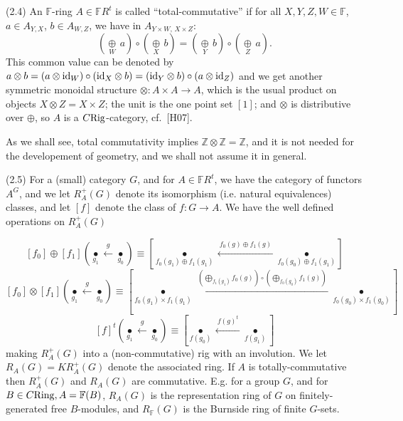 \documentclass[leqno]{article}
\numberwithin{equation}{section}
\begin{document}
\bigskip

\noindent (2.4)  An ${\mathbb F}$-ring $A \in {\mathbb F} R^t$ is called ``total-commutative'' if for all $X,Y,Z,W \in {\mathbb F}$, $a \in A_{Y,X}$, $b \in A_{W,Z}$, we have in $A_{Y \times W , \, X \times Z}$:
$$
\left( \underset{W}{\oplus} \, a \right) \circ \left( \underset{X}{\oplus} \, b \right) = \left( \underset{Y}{\oplus} \, b \right) \circ \left( \underset{Z}{\oplus} \, a \right) .
$$
This common value can be denoted by $a \otimes b = (a \otimes {\rm id}_W) \circ ({\rm id}_X \otimes b) =  ({\rm id}_Y \otimes b) \circ (a \otimes {\rm id}_Z)$ and we get another symmetric monoidal structure $\otimes : A \times A \to A$, which is the usual product on objects $X \otimes Z = X \times Z$; the unit is the one point set $[1]$; and $\otimes$ is distributive over $\oplus$, so $A$ is a $C{\rm Rig}$-category, cf.~[H07].

\smallskip

As we shall see, total commutativity implies ${\mathbb Z} \otimes {\mathbb Z} = {\mathbb Z}$, and it is not needed for the developement of geometry, and we shall not assume it in general.

\bigskip

\noindent (2.5)  For a (small) category $G$, and for $A \in {\mathbb F} R^t$, we have the category of functors $A^G$, and we let $R_A^+ (G)$ denote its isomorphism (i.e. natural equivalences) classes, and let $[f]$ denote the class of $f : G \to A$. We have the well defined operations on $R_A^+ (G)$

$$
[f_0] \oplus [f_1] \left( \underset{g_1}{\bullet} \overset{g}{\longleftarrow} \underset{g_0}{\bullet} \right) \equiv \left[ \underset{f_0 (g_1) \oplus f_1 (g_1)}{\bullet} \xleftarrow{ \ f_0 (g) \oplus f_1 (g) \ } \underset{f_0 (g_0) \oplus f_1 (g_1)}{\bullet} \right]
$$
$$
[f_0] \otimes [f_1] \left( \underset{g_1}{\bullet} \overset{g}{\longleftarrow} \underset{g_0}{\bullet} \right) \equiv \left[ \underset{f_0 (g_1) \times f_1 (g_1)}{\bullet} \xleftarrow{ \ \left( \underset{f_1 (g_1)}{\bigoplus} f_0 (g) \right) \circ \left(\underset{f_0 (g_0)}{\bigoplus} f_1 (g)\right) \ } \underset{f_0 (g_0) \times f_1 (g_0)}{\bullet} \right]
$$
$$
[f]^t \left( \underset{g_1}{\bullet} \overset{g}{\longleftarrow} \underset{g_0}{\bullet} \right) \equiv \left[ \underset{f(g_0)}{\bullet} \xleftarrow{ \ f(g)^t \ } \underset{f(g_1)}{\bullet} \right]
$$
making $R_A^+ (G)$ into a (non-commutative) rig with an involution. We let $R_A (G) = K R_A^+ (G)$ denote the associated ring. If $A$ is totally-commutative then $R_A^+ (G)$ and $R_A(G)$ are commutative. E.g. for a group $G$, and for $B \in C{\rm Ring},A=\mathbb{F}(B)$, $R_A(G)$ is the representation ring of $G$ on finitely-generated free $B$-modules, and $R_{\mathbb F} (G)$ is the Burnside ring of finite $G$-sets.
\end{document}
